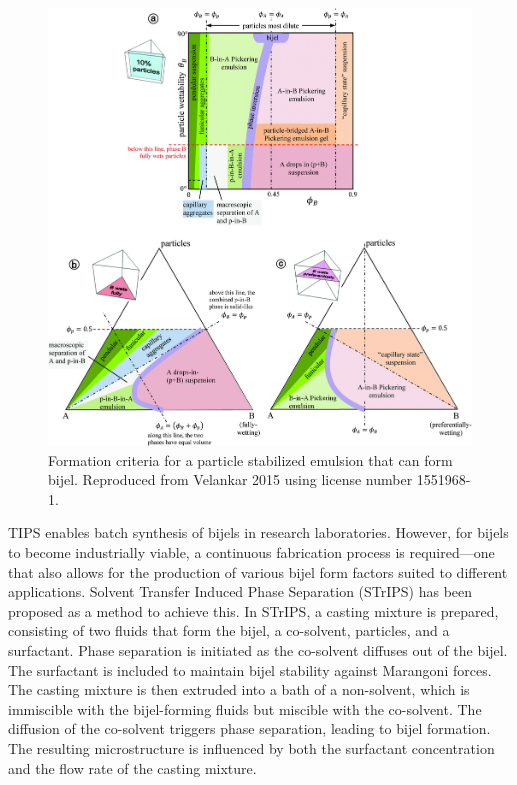 \begin{figure}
    \centering
    \includegraphics[scale = 0.2]{figures/literature_review/state_diagram.jpg}
    \caption{Formation criteria for a particle stabilized emulsion that can form bijel. 
            Reproduced from Velankar 2015 using license number 1551968-1. \cite{velankar_non-equilibrium_2015}}
    \label{fig:state_diagram_particle_emulsions}
\end{figure}

TIPS enables batch synthesis of bijels in research laboratories. However, for bijels to become industrially viable, a continuous fabrication process is required—one 
that also allows for the production of various bijel form factors suited to different applications. Solvent Transfer Induced Phase Separation (STrIPS) has been proposed 
as a method to achieve this. In STrIPS, a casting mixture is prepared, consisting of two fluids that form the bijel, a co-solvent, particles, and a surfactant. Phase 
separation is initiated as the co-solvent diffuses out of the bijel. The surfactant is included to maintain bijel stability against Marangoni forces. The casting mixture 
is then extruded into a bath of a non-solvent, which is immiscible with the bijel-forming fluids but miscible with the co-solvent. The diffusion of the co-solvent triggers 
phase separation, leading to bijel formation. The resulting microstructure is influenced by both the surfactant concentration and the flow rate of the casting mixture.

